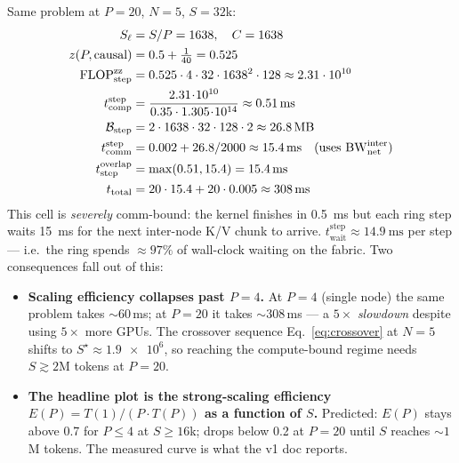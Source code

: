 \documentclass[11pt]{article}
\newcommand{\flops}{\mathrm{FLOP}}
\newcommand{\bw}{\mathrm{BW}}
\newcommand{\comp}{\mathrm{comp}}
\newcommand{\comm}{\mathrm{comm}}
\newcommand{\wait}{\mathrm{wait}}
\newcommand{\tot}{\mathrm{total}}
\newcommand{\step}{\mathrm{step}}
\newcommand{\zz}{\mathrm{zz}}
\begin{document}
Same problem at $P = 20$, $N = 5$, $S = 32$k:
\begin{align}
  S_\ell &= S/P = 1638,\quad C = 1638 \\
  z(P,\text{causal}) &= 0.5 + \tfrac{1}{40} = 0.525 \\
  \flops_\step^\zz   &= 0.525 \cdot 4 \cdot 32 \cdot 1638^2 \cdot 128
                       \approx 2.31 \cdot 10^{10} \\
  t_\comp^\step      &= \frac{2.31\!\cdot\!10^{10}}
                              {0.35 \cdot 1.305\!\cdot\!10^{14}}
                       \approx \SI{0.51}{\milli\second} \\
  \mathcal{B}_\step  &= 2 \cdot 1638 \cdot 32 \cdot 128 \cdot 2
                       \approx \SI{26.8}{\mega\byte} \\
  t_\comm^\step      &= 0.002 + 26.8 / 2000
                       \approx \SI{15.4}{\milli\second}
                       \quad\text{(uses } \bw_{\text{net}}^{\text{inter}}\text{)} \\
  t_\step^{\text{overlap}} &= \max(0.51, 15.4) = \SI{15.4}{\milli\second} \\
  t_\tot             &= 20 \cdot 15.4 + 20 \cdot 0.005
                       \approx \SI{308}{\milli\second}
\end{align}
This cell is \emph{severely} comm-bound: the kernel
finishes in \SI{0.5}{\milli\second} but each ring step waits
\SI{15}{\milli\second} for the next inter-node K/V chunk to arrive.
$t_\wait^\step \approx \SI{14.9}{\milli\second}$ per step ---
i.e.~the ring spends $\approx 97\%$ of wall-clock waiting on the
fabric. Two consequences fall out of this:

\begin{itemize}
  \item \textbf{Scaling efficiency collapses past $P = 4$.} At $P = 4$
        (single node) the same problem takes $\sim 60$\,ms; at
        $P = 20$ it takes $\sim 308$\,ms --- a $5\times$
        \emph{slowdown} despite using $5\times$ more GPUs. The crossover
        sequence Eq.~\eqref{eq:crossover} at $N=5$ shifts to
        $S^\star \approx \num{1.9e6}$, so reaching the compute-bound
        regime needs $S \gtrsim 2\text{M}$ tokens at $P = 20$.
  \item \textbf{The headline plot is the strong-scaling efficiency
        $E(P) = T(1) / (P \cdot T(P))$ as a function of $S$.}
        Predicted: $E(P)$ stays above 0.7 for $P \le 4$ at
        $S \ge 16$k; drops below 0.2 at $P = 20$ until $S$ reaches
        $\sim 1$M tokens. The measured curve is what the v1 doc reports.
\end{itemize}
\end{document}
